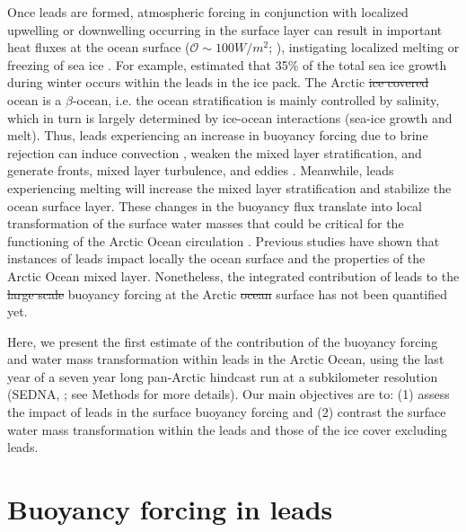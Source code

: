 \documentclass[lineno,sn-basic]{sn-jnl}%
\providecommand{\DIFadd}[1]{{\protect\color{blue}\uwave{#1}}} %
\providecommand{\DIFdel}[1]{{\protect\color{red}\sout{#1}}}                      %
\providecommand{\DIFaddbegin}{} %
\providecommand{\DIFaddend}{} %
\providecommand{\DIFdelbegin}{} %
\providecommand{\DIFdelend}{} %
\newcommand{\DIFscaledelfig}{0.5}
\newlength{\DIFdelgraphicswidth} %
\newlength{\DIFdelgraphicsheight} %
\newcommand{\DIFaddincludegraphics}[2][]{{\color{blue}\fbox{\DIFOincludegraphics[#1]{#2}}}} %
\newcommand{\DIFdelincludegraphics}[2][]{%
\sbox{\DIFdelgraphicsbox}{\DIFOincludegraphics[#1]{#2}}%
\settoboxwidth{\DIFdelgraphicswidth}{\DIFdelgraphicsbox} %
\settoboxtotalheight{\DIFdelgraphicsheight}{\DIFdelgraphicsbox} %
\scalebox{\DIFscaledelfig}{%
\parbox[b]{\DIFdelgraphicswidth}{\usebox{\DIFdelgraphicsbox}\\[-\baselineskip] \rule{\DIFdelgraphicswidth}{0em}}\llap{\resizebox{\DIFdelgraphicswidth}{\DIFdelgraphicsheight}{%
\setlength{\unitlength}{\DIFdelgraphicswidth}%
\begin{picture}(1,1)%
\thicklines\linethickness{2pt} %
{\color[rgb]{1,0,0}\put(0,0){\framebox(1,1){}}}%
{\color[rgb]{1,0,0}\put(0,0){\line( 1,1){1}}}%
{\color[rgb]{1,0,0}\put(0,1){\line(1,-1){1}}}%
\end{picture}%
}\hspace*{3pt}}} %
} %
\DeclareRobustCommand{\DIFaddbegin}{\DIFOaddbegin \let\includegraphics\DIFaddincludegraphics} %
\DeclareRobustCommand{\DIFaddend}{\DIFOaddend \let\includegraphics\DIFOincludegraphics} %
\DeclareRobustCommand{\DIFdelbegin}{\DIFOdelbegin \let\includegraphics\DIFdelincludegraphics} %
\DeclareRobustCommand{\DIFdelend}{\DIFOaddend \let\includegraphics\DIFOincludegraphics} %
\begin{document}
Once leads are formed, atmospheric forcing in conjunction with localized upwelling or downwelling occurring in the surface layer can result in important heat fluxes at the ocean surface ($\mathcal{O} \sim 100 W/m^2$; \citealp{Bourgault_flux_lkf_2020,Marcq_flux_lead_2012,McPhee_LKF_2005,Maykut_heat_1986}), instigating localized melting or freezing of sea ice \citep{Albedyll_thickness_dis_2022}. For example, \citet{Boutin_rheology_2023} estimated that 35\% of the total sea ice growth during winter occurs within the leads in the ice pack. The Arctic \DIFdelbegin \DIFdel{ice covered }\DIFdelend \DIFaddbegin \DIFadd{ice-covered }\DIFaddend ocean is a $\beta$-ocean, i.e. the ocean stratification is mainly controlled by salinity, which in turn is largely determined by ice-ocean interactions (sea-ice growth and melt). Thus, leads experiencing an increase in buoyancy forcing due to brine rejection can induce convection \citep{Smith_convection_1998}, weaken the mixed layer stratification, and generate fronts, mixed layer turbulence, and eddies \citep{Reiser_LKF_2020, Smith_generation_2002}. Meanwhile, leads experiencing melting will increase the mixed layer stratification and stabilize the ocean surface layer. These changes in the buoyancy flux translate into local transformation of the surface water masses that could be critical for the functioning of the Arctic Ocean circulation \citep{Lenn_mixing_2022, Pemberton_WMT_2015, Smith_polynyas_1990}. 
Previous studies have shown that instances of leads impact locally the ocean surface and the properties of the Arctic Ocean mixed layer. Nonetheless, the integrated contribution of leads to the \DIFdelbegin \DIFdel{large scale }\DIFdelend \DIFaddbegin \DIFadd{large-scale }\DIFaddend buoyancy forcing at the Arctic \DIFdelbegin \DIFdel{ocean }\DIFdelend \DIFaddbegin \DIFadd{Ocean }\DIFaddend surface has not been quantified yet.

Here, we present the first estimate of the contribution of the buoyancy forcing and water mass transformation within leads in the Arctic Ocean, using the last year of a seven year long pan-Arctic hindcast run at a subkilometer resolution (SEDNA, \citealp{SEDNA_2023}; see Methods for more details). Our main objectives are to: (1) assess the impact of leads in the surface buoyancy forcing and (2) contrast the surface water mass transformation within the leads and those of the ice cover excluding leads.

\section{Buoyancy forcing in leads}\label{sec2}
\end{document}
